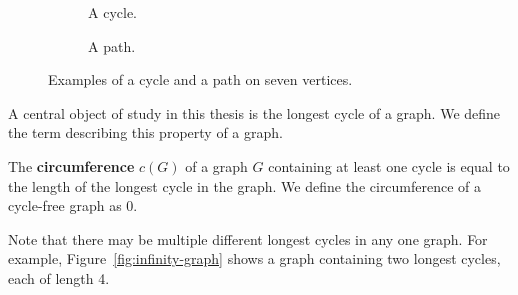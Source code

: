 \begin{figure}[ht]
    \centering

    \begin{subfigure}{0.45\textwidth}
        \centering
        \caption{A cycle.}
        \label{fig:cycle-subfigure}
    \end{subfigure}
    \hfill
    \begin{subfigure}{0.45\textwidth}
        \centering
        \caption{A path.}
        \label{fig:path-subfigure}
    \end{subfigure}

    \caption{Examples of a cycle and a path on seven vertices.}
    \label{fig:cycle-and-path}
\end{figure}

A central object of study in this thesis is the longest cycle of a graph. We define the term describing this property of a graph. 

\begin{definition}[Circumference]
  The \textbf{circumference} $c(G)$ of a graph $G$ containing at least one cycle is equal to the length of the longest cycle in the graph. We define the circumference of a cycle-free graph as $0$.
\end{definition}

Note that there may be multiple different longest cycles in any one graph. For example, Figure~\ref{fig:infinity-graph} shows a graph containing two longest cycles, each of length 4.

